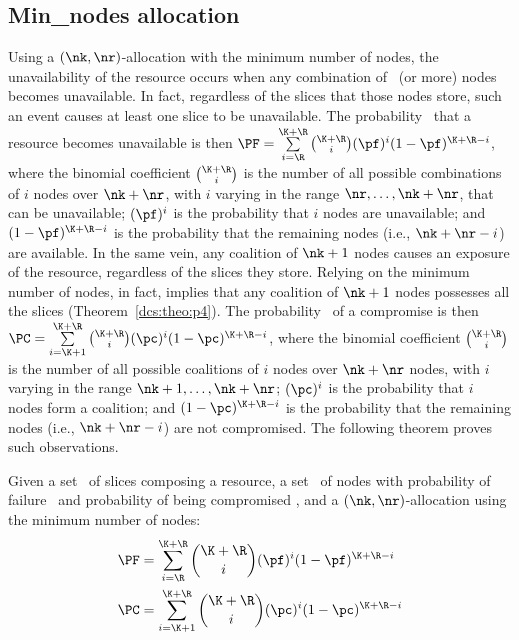 {\subsection{Min\_nodes allocation}\label{dcs:sec:minnode}

Using a $(\nk,\nr)$-allocation with the minimum number of nodes, the
unavailability of the resource occurs when any combination of \nr\ (or
more) nodes becomes unavailable. In fact, regardless of the slices
that those nodes store, such an event causes at least one slice to be
unavailable.  The probability \PF\ that a resource becomes unavailable
is then $\PF= \sum\limits_{i={\R}}^{{\K}+{\R}} {{\K+\R}\choose{i}}
(\pf)^i (1 - \pf)^{{\K}+{\R}-i}$, where the binomial coefficient
${{\K+\R}\choose{i}}$ is the number of all possible combinations of
$i$ nodes over $\nk+\nr$, with $i$ varying in the range
$\nr,\ldots,\nk+\nr$, that can be unavailable; $(\pf)^{i}$ is the
probability that $i$ nodes are unavailable; and $(1 -
\pf)^{{\K}+{\R}-i}$ is the probability that the remaining nodes (i.e.,
$\nk+\nr-i$) are available.  In the same vein, any coalition of
$\nk+1$ nodes causes an exposure of the resource, regardless of the
slices they store. Relying on the minimum number of nodes, in fact,
implies that any coalition of $\nk+1$ nodes possesses all the slices
(Theorem~\ref{dcs:theo:p4}).  The probability \PC\ of a compromise is then
$\PC= \sum\limits_{i={\K}+1}^{{\K}+{\R}} {{\K+\R}\choose{i}} (\pc)^i
(1 - \pc)^{{\K}+{\R}-i}$, where the binomial coefficient
${{\K+\R}\choose{i}}$ is the number of all possible coalitions of $i$
nodes over $\nk+\nr$ nodes, with $i$ varying in the range
$\nk+1,\ldots,\nk+\nr$; $(\pc)^i$ is the probability that $i$ nodes
form a coalition; and $(1 - \pc)^{{\K}+{\R}-i}$ is the probability
that the remaining nodes (i.e., $\nk+\nr-i$) are not compromised.  The
following theorem proves such observations.


\smallskip
\begin{theorem}\label{dcs:teo:security-kompact}
Given a set \Shards\ of slices composing a resource, a set \Nodes\ of
nodes with probability of failure \pf\ and probability of being
compromised \pc, and a $(\nk,\nr)$-allocation using the minimum number
of nodes:
	\begin{align*}
		  & \PF = \sum\limits_{i={\R}}^{{\K}+{\R}} {{\K+\R}\choose{i}} (\pf)^i (1 - \pf)^{{\K}+{\R}-i} \\
		  & \PC = \sum\limits_{i={\K}+1}^{{\K}+{\R}}{{\K+\R}\choose{i}} (\pc)^i (1 - \pc)^{{\K}+{\R}-i}
	\end{align*}
\end{theorem}
\smallskip



}
